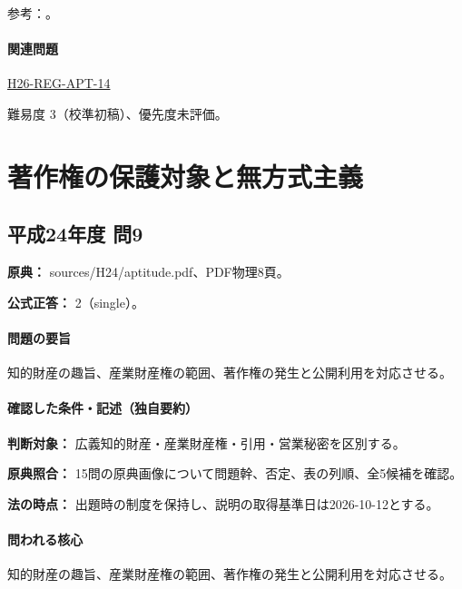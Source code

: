 \par 参考：\cite{ip_copyright_statute}。

\paragraph{関連問題} \hyperref[q:h26-reg-apt-14]{H26-REG-APT-14}

\par 難易度 3（校準初稿）、優先度未評価。

\section{著作権の保護対象と無方式主義}

\subsection{平成24年度 問9}
\label{q:h24-reg-apt-09}

\noindent\textbf{原典：} sources/H24/aptitude.pdf、PDF物理8頁。

\textbf{公式正答：} 2（single）。

\paragraph{問題の要旨} 知的財産の趣旨、産業財産権の範囲、著作権の発生と公開利用を対応させる。

\paragraph{確認した条件・記述（独自要約）}\mbox{}\par

\noindent\textbf{判断対象：} 広義知的財産・産業財産権・引用・営業秘密を区別する。\par

\noindent\textbf{原典照合：} 15問の原典画像について問題幹、否定、表の列順、全5候補を確認。\par

\noindent\textbf{法の時点：} 出題時の制度を保持し、説明の取得基準日は2026-10-12とする。\par

\paragraph{問われる核心} 知的財産の趣旨、産業財産権の範囲、著作権の発生と公開利用を対応させる。

